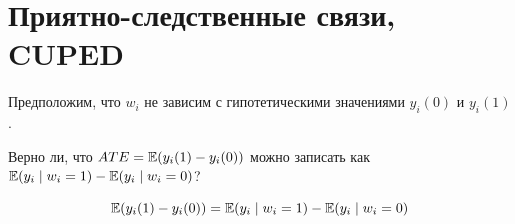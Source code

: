 \begin{problem}
  \begin{sol}
  \end{sol}  
\end{problem}

\begin{problem}
  \begin{sol}
  \end{sol}  
\end{problem}





\section{Приятно-следственные связи, CUPED}


\begin{problem}
Предположим, что $w_i$ не зависим с гипотетическими значениями $y_i(0)$
и $y_i(1)$.

Верно ли, что $ATE = \operatorname{\mathbb{E}}(y_i(1)  - y_i(0))$ можно записать как 
$\operatorname{\mathbb{E}}(y_i \mid w_i = 1) - \operatorname{\mathbb{E}}(y_i \mid w_i = 0)$?

\begin{sol}

\[  
  \operatorname{\mathbb{E}}(y_i(1)  - y_i(0)) = \operatorname{\mathbb{E}}(y_i \mid w_i = 1) - \operatorname{\mathbb{E}}(y_i \mid w_i = 0)
\]

\end{sol}

\end{problem}


